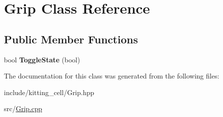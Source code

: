 \hypertarget{classGrip}{}\section{Grip Class Reference}
\label{classGrip}
\subsection*{Public Member Functions}
\begin{DoxyCompactItemize}
\item 
bool {\bfseries Toggle\+State} (bool)\hypertarget{classGrip_ad184a5badf82fce0514c1a6d8f9667f2}{}\label{classGrip_ad184a5badf82fce0514c1a6d8f9667f2}

\end{DoxyCompactItemize}


The documentation for this class was generated from the following files\+:\begin{DoxyCompactItemize}
\item 
include/kitting\+\_\+cell/Grip.\+hpp\item 
src/\hyperlink{Grip_8cpp}{Grip.\+cpp}\end{DoxyCompactItemize}
